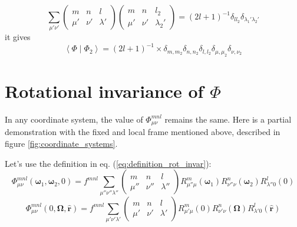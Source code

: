 \begin{equation}
\sum_{\mu'\nu'}\left(\begin{array}{ccc}
m & n & l\\
\mu' & \nu' & \lambda'
\end{array}\right)\left(\begin{array}{ccc}
m & n & l_{2}\\
\mu' & \nu' & \lambda_{2}'
\end{array}\right)=\left(2l+1\right)^{-1}\delta_{ll_{2}}\delta_{\lambda_{1}'\lambda_{2}'}
\end{equation}
it gives
\begin{equation}
\left\langle \Phi\mid\Phi_{2}\right\rangle =\left(2l+1\right)^{-1}\times\delta_{m,m_{2}}\delta_{n,n_{2}}\delta_{l,l_{2}}\delta_{\mu,\mu_{2}}\delta_{\nu,\nu_{2}}\label{eq:2b-ortho}
\end{equation}


\section{Rotational invariance of $\Phi$}

In any coordinate system, the value of $\Phi_{\mu\nu}^{mnl}$ remains
the same. Here is a partial demonstration with the fixed and local
frame mentioned above, described in figure \ref{fig:coordinate_systems}.

Let's use the definition in eq. (\ref{eq:definition_rot_invar}):
\begin{equation}
\Phi_{\mu\nu}^{mnl}(\boldsymbol{\omega}_{1},\boldsymbol{\omega}_{2},0)=f^{mnl}\sum_{\mu''\nu''\lambda''}\left(\begin{array}{ccc}
m & n & l\\
\mu'' & \nu'' & \lambda''
\end{array}\right)R_{\mu''\mu}^{m}(\boldsymbol{\omega}_{1})R_{\nu''\nu}^{n}(\boldsymbol{\omega}_{2})R_{\lambda''0}^{l}(0)
\end{equation}
\begin{equation}
\Phi_{\mu\nu}^{mnl}(0,\mathbf{\Omega},\mathbf{\hat{r}})=f^{mnl}\sum_{\mu'\nu'\lambda'}\left(\begin{array}{ccc}
m & n & l\\
\mu' & \nu' & \lambda'
\end{array}\right)R_{\mu'\mu}^{m}(0)R_{\nu'\nu}^{n}(\mathbf{\Omega})R_{\lambda'0}^{l}(\mathbf{\hat{r}})
\end{equation}

